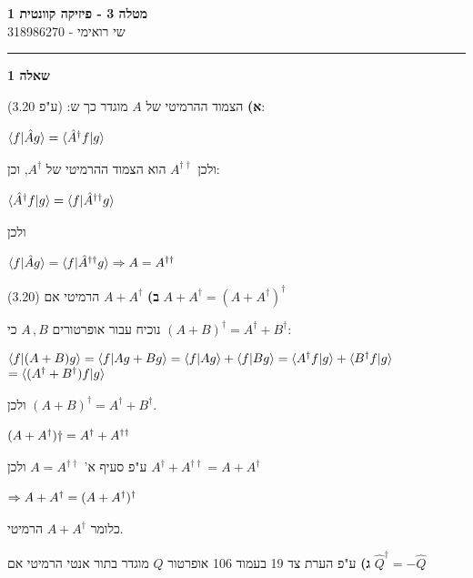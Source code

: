\documentclass[14pt]{extarticle}
\makeatletter
\newenvironment{lefteqs}{%
    \begin{english}%
    \begin{flushleft}%
    \renewcommand{\arraystretch}{1.3}%
    $\begin{array}{@{}l@{}}%
}{%
    \end{array}$%
    \end{flushleft}%
    \end{english}%
}
\makeatother
\begin{document}
\begin{center}
    {\LARGE \textbf{מטלה 3 - פיזיקה קוונטית 1}}\\[0.5em]
    {\large שי רואימי - 318986270}\\[0.3em]
\end{center}

\hrule
\vspace{2em}

\textbf{\large שאלה 1}

\textbf{א)}
הצמוד ההרמיטי של $A$ מוגדר כך ש: (ע"פ 3.20):
\begin{lefteqs}
    \langle f | \hat{A} g \rangle = \langle \hat{A}^\dagger f | g \rangle
\end{lefteqs}
ולכן $A^{\dagger \dagger}$ הוא הצמוד ההרמיטי של $A^\dagger$, וכן:
\begin{lefteqs}
    \langle \hat{A}^\dagger f | g \rangle = \langle f | \hat{A}^{\dagger \dagger} g \rangle
\end{lefteqs}
ולכן
\begin{lefteqs}
    \langle f | \hat{A} g \rangle = \langle f | \hat{A}^{\dagger \dagger} g \rangle \Rightarrow A = A^{\dagger \dagger}
\end{lefteqs}

\textbf{ב)}
$A+A^\dagger$ הרמיטי אם (3.20) $A+A^\dagger = (A+A^\dagger)^\dagger$

נוכיח עבור אופרטורים $A \, , B$ כי $(A+B)^\dagger = A^\dagger + B^\dagger$:
\begin{lefteqs}
    \langle f | (A+B) g \rangle = \langle f | Ag + Bg \rangle = \langle f | A g \rangle + \langle f | Bg \rangle = \langle A^\dagger f | g \rangle + \langle B^\dagger f | g \rangle \\
    = \langle (A^\dagger + B^\dagger) f | g \rangle 
\end{lefteqs}
ולכן $(A+B)^\dagger = A^\dagger + B^\dagger$.
\begin{lefteqs}
    (A+A^\dagger)\dagger = A^\dagger + A^{\dagger \dagger}
\end{lefteqs}
ע"פ סעיף א' $A=A^{\dagger \dagger}$ ולכן $A^\dagger + A^{\dagger \dagger} = A+A^\dagger$

\begin{lefteqs}
    \Rightarrow A+A^\dagger = (A+A^\dagger)^\dagger
\end{lefteqs}

כלומר $A+A^\dagger$ הרמיטי.

\textbf{ג)}
ע"פ הערת צד 19 בעמוד 106 אופרטור $Q$ מוגדר בתור אנטי הרמיטי אם $\hat{Q}^\dagger = -\hat{Q}$
\end{document}
